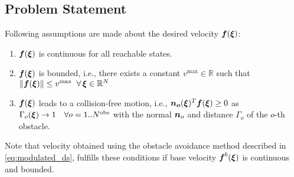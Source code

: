 \subsection{Problem Statement}
Following assumptions are made about the desired velocity $\boldsymbol{f}(\boldsymbol{\xi})$:
\begin{enumerate}
    \item $\boldsymbol{f}(\boldsymbol{\xi})$ is continuous for all reachable states.
    \item $\boldsymbol{f}(\boldsymbol{\xi})$ is bounded, i.e., there exists a constant $v^{\mathrm{max}} \in \mathbb{R}$ such that $\| \boldsymbol{f}(\boldsymbol{\xi}) \| \leq v^{\mathrm{max}} \;\; \forall \, \boldsymbol{\xi} \in \mathbb{R}^N$
    \item $\boldsymbol{f}(\boldsymbol{\xi})$ leads to a collision-free motion, i.e., $\boldsymbol{n_o}(\boldsymbol{\xi})^T \boldsymbol{f}(\boldsymbol{\xi}) \geq 0$ as $\Gamma_o(\boldsymbol{\xi}) \rightarrow 1 \quad \forall o = 1 .. N^{\mathrm{obs}}$ with the normal $\boldsymbol{n}_o$ and distance $\Gamma_o$ of the $o$-th obstacle. 
\end{enumerate}

Note that velocity obtained using the obstacle avoidance method described in \eqref{eq:modulated_ds}, fulfills these conditions if base velocity $\boldsymbol{f}^b(\boldsymbol{\xi})$ is continuous and bounded.

